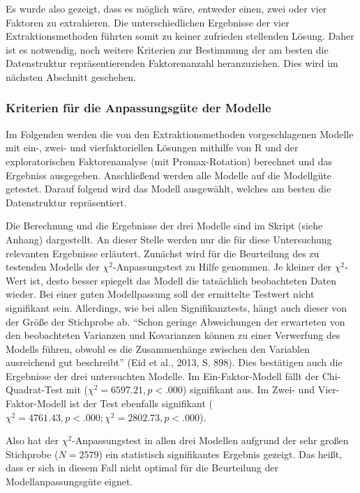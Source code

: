 \documentclass[12pt,a4paper]{article}
\begin{document}
	Es wurde also gezeigt, dass es möglich wäre, entweder einen, zwei oder vier Faktoren zu extrahieren. Die unterschiedlichen Ergebnisse der vier Extraktionsmethoden führten somit zu keiner zufrieden stellenden Lösung. Daher  ist es notwendig, noch weitere Kriterien zur Bestimmung der am besten die Datenstruktur repräsentierenden Faktorenanzahl heranzuziehen. Dies wird im nächsten Abschnitt geschehen.

\subsubsection{Kriterien für die Anpassungsgüte der Modelle}
Im Folgenden werden die von den Extraktionsmethoden vorgeschlagenen Modelle mit ein-, zwei- und vierfaktoriellen Lösungen mithilfe von R und der exploratorischen Faktorenanalyse (mit Promax-Rotation) berechnet und das Ergebniss ausgegeben. Anschließend werden alle Modelle auf die Modellgüte getestet. Darauf folgend wird das Modell ausgewählt, welches am besten die Datenstruktur repräsentiert.

	Die Berechnung und die Ergebnisse der drei Modelle sind im Skript (siehe Anhang) dargestellt. An dieser Stelle werden nur die für diese Untersuchung relevanten Ergebnisse erläutert. Zunächst wird für die Beurteilung des zu testenden Modells der $\chi^2$-Anpassungstest zu Hilfe genommen. Je kleiner der $\chi^2$-Wert ist, desto besser spiegelt das Modell die tatsächlich beobachteten Daten wieder. Bei einer guten Modellpassung soll der ermittelte Testwert nicht signifikant sein. Allerdings, wie bei allen Signifikanztests, hängt auch dieser von der Größe der Stichprobe ab. "`Schon geringe Abweichungen der erwarteten von den beobachteten Varianzen und Kovarianzen können zu einer Verwerfung des Modells führen, obwohl es die Zusammenhänge zwischen den Variablen ausreichend gut beschreibt"' (Eid et al., 2013, S. 898). Dies bestätigen auch die Ergebnisse der drei untersuchten Modelle. Im Ein-Faktor-Modell fällt der Chi-Quadrat-Test mit ($\chi^2 = 6597.21, p< .000$) signifikant aus. Im Zwei- und Vier-Faktor-Modell ist der Test ebenfalls signifikant ($\chi^2  = 4761.43, p< .000;  \chi^2 = 2802.73, p < .000$).
	
	Also hat der $\chi^2$-Anpassungstest in allen drei Modellen aufgrund der sehr großen Stichprobe ($N = 2579$) ein statistisch signifikantes Ergebnis gezeigt. Das heißt, dass er sich in diesem Fall nicht optimal für die Beurteilung der Modellanpassungsgüte eignet.
	
\end{document}
